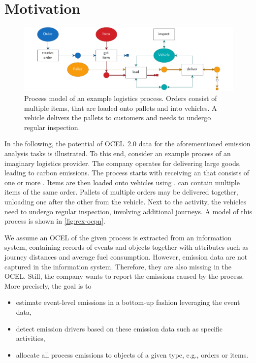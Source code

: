 \section{Motivation}
\label{sec:intro-motiv}

\begin{figure}[t]
  \includegraphics[width=\textwidth]{figures/concept/rex-logistics-ocpn.pdf}
  \caption{Process model of an example logistics process. Orders consist of multiple items, that are loaded onto pallets and into vehicles. A vehicle delivers the pallets to customers and needs to undergo regular inspection.}
  \label{fig:rex-ocpn}
\end{figure}

In the following, the potential of OCEL~2.0 data for the aforementioned emission analysis tasks is illustrated.
To this end, consider an example process of an imaginary logistics provider.
The company operates  for delivering large goods, leading to carbon emissions.
The process starts with receiving an  that consists of one or more .
Items are then loaded onto vehicles using .
 can contain multiple items of the same order. Pallets of multiple orders may be delivered together, unloading one after the other from the vehicle.
Next to the  activity, the vehicles need to undergo regular inspection, involving additional journeys.
A model of this process is shown in \autoref{fig:rex-ocpn}.

We assume an OCEL of the given process is extracted from an information system,
containing records of events and objects together with attributes such as journey distances and average fuel consumption.
However, emission data are not captured in the information system.
Therefore, they are also missing in the OCEL.
Still, the company wants to report the emissions caused by the process. More precisely, the goal is to
\begin{itemize}
	\item estimate event-level emissions in a bottom-up fashion leveraging the event data,
	\item detect emission drivers based on these emission data such as specific activities,
	\item allocate all process emissions to objects of a given type, e.g., orders or items.
\end{itemize}

